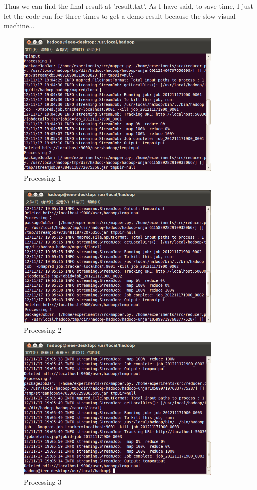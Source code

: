 \documentclass{article}
\begin{document}
Thus we can find the final result at 'result.txt'. As I have said, to save time, I just let the code run for three times to get a demo result because the slow visual machine...\\
\begin{figure}[htbp]
\centering
\includegraphics[width=10cm]{4.png}
\caption{Processing 1}
\end{figure}
\begin{figure}[htbp]
\centering
\includegraphics[width=10cm]{5.png}
\caption{Processing 2}
\end{figure}
\begin{figure}[htbp]
\centering
\includegraphics[width=10cm]{1.png}
\caption{Processing 3}
\end{figure}
\end{document}
